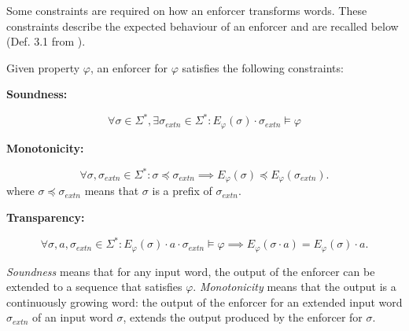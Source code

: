 Some constraints are required on how an enforcer transforms words. These constraints describe the expected behaviour of an enforcer and are recalled below (Def. 3.1 from \cite{10.1145/3126500}).
\begin{definition}
 Given property $\varphi$, an enforcer for $\varphi$ satisfies the following constraints:
 \begin{flushleft}
 \textbf{Soundness:}
 \end{flushleft}
 \begin{equation*}
            \label{eq:snd}
 \forall \sigma \in \Sigma^{\ast}, \exists \sigma_{extn} \in \Sigma^{\ast} : E_{\varphi} (\sigma) \cdot \sigma_{extn} \models \varphi
 \end{equation*}
        
 \begin{flushleft}
 \textbf{Monotonicity:}
 \end{flushleft}
 \begin{equation*}
            \label{eq:mo}
 \forall \sigma, \sigma_{extn} \in \Sigma^{\ast}: \sigma \preccurlyeq \sigma_{extn} \implies E_{\varphi} (\sigma) \preccurlyeq E_{\varphi} (\sigma_{extn}).
 \end{equation*} 
 where $\sigma \preccurlyeq \sigma_{extn}$ means that $\sigma$ is a prefix of $\sigma_{extn}$.

 \begin{flushleft}
 \textbf{Transparency:}
 \end{flushleft}
 \begin{equation*}
            \label{eq:tr}
 \forall \sigma, a, \sigma_{extn} \in \Sigma^{\ast} : E_{\varphi} (\sigma) \cdot a \cdot \sigma_{extn} \models \varphi \implies E_{\varphi} (\sigma \cdot a) = E_{\varphi} (\sigma) \cdot a.
 \end{equation*} 
        \label{constraints1}
\end{definition}
\vspace{-1em}
\textit{Soundness} means that for any input word, the output of the enforcer can be extended to a sequence that satisfies $\varphi$. \textit{Monotonicity} means that the output is a continuously growing word: the output of the enforcer for an extended input word $\sigma_{extn}$ of an input word $\sigma$, extends the output produced by the enforcer for $\sigma$. %
